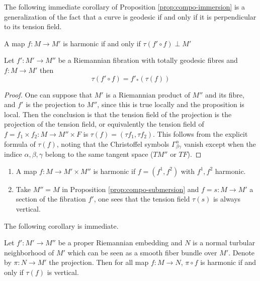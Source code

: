 The following immediate corollary of Proposition \ref{prop:compo-immersion} is a generalization of the fact that a curve is geodesic if and only if it
is perpendicular to its tension field.

\begin{corollary}
A map \(f: M \longrightarrow M'\) is harmonic if and only if \(\tau(f'\circ f) \perp M'\)
\end{corollary}




\begin{proposition}
\label{prop:compo-submersion}
Let \(f': M' \longrightarrow M''\) be a Riemannian fibration with totally geodesic
fibres and \(f: M \longrightarrow M'\) then 
\[
\tau(f'\circ f) = f'_*(\tau(f))  
\]
\end{proposition}

\begin{proof}
One can suppose that \(M'\) is a Riemannian product of \(M''\) and its fibre, and
\(f'\) is the projection to \(M''\), since this is true locally and the proposition is
local. Then the conclusion is that the tension field of the projection is the projection
of the tension field, or equivalently the tension field of \(f= f_1\times f_2: M \longrightarrow
M''\times F\) is \(\tau(f) = (\tau f_1,\tau f_2)\). This follows from the explicit
formula of \(\tau(f)\), noting that the Christoffel symbols \(\Gamma^\alpha_{\beta\gamma}\) vanish except when the indice \(\alpha,\beta,\gamma\)
belong to the same tangent space (\(TM''\) or \(TF\)).
\end{proof}

\begin{exampl}
\begin{enumerate}
\item A map \(f: M \longrightarrow M'\times M''\) is harmonic if \(f=(f^1, f^2)\) with \(f^1, f^2\) harmonic.
\item Take \(M''=M\) in Proposition \ref{prop:compo-submersion} and \(f=s: M \longrightarrow M'\) a
section of the fibration \(f'\), one sees that the tension field \(\tau(s)\) is
always vertical.
\end{enumerate}
\end{exampl}

The following corollary is immediate.
\begin{corollary}
\label{cor:compo-with-submersion}
Let \(f': M' \longrightarrow M''\) be a proper Riemannian embedding and \(N\) is a
normal turbular neighborhood of \(M'\) which can be seen as a smooth fiber bundle over
\(M'\). Denote by \(\pi: N \longrightarrow M'\) the projection. Then for all map \(f:
M \longrightarrow N\), \(\pi\circ f\) is harmonic if and only if \(\tau(f)\) is vertical. 
\end{corollary}




